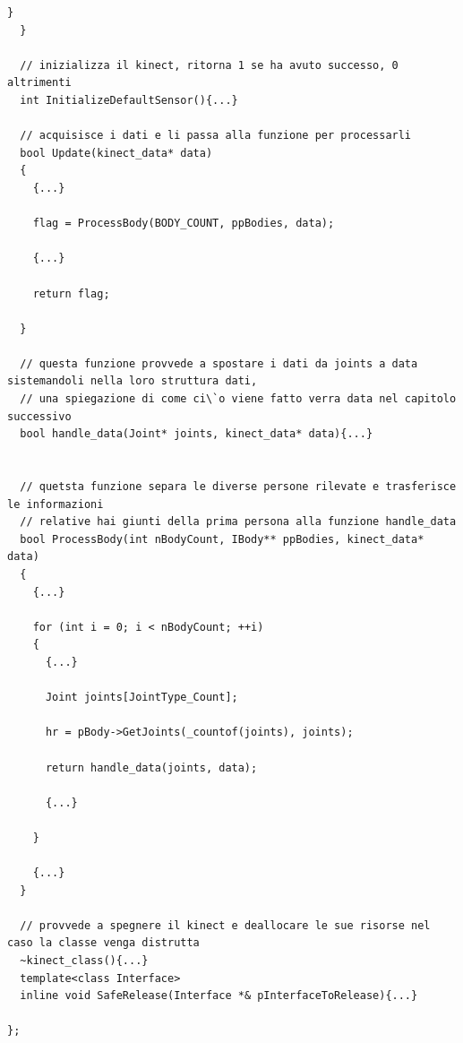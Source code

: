 \documentclass[10pt,a4paper]{article}
\begin{document}
\begin{lstlisting}[style=mycpp, caption=classe kinect\_class, captionpos=b]
    }
  }

  // inizializza il kinect, ritorna 1 se ha avuto successo, 0 altrimenti
  int InitializeDefaultSensor(){...}

  // acquisisce i dati e li passa alla funzione per processarli
  bool Update(kinect_data* data)
  {
    {...}
    
    flag = ProcessBody(BODY_COUNT, ppBodies, data);
    
    {...}
    
    return flag;
    
  }

  // questa funzione provvede a spostare i dati da joints a data sistemandoli nella loro struttura dati, 
  // una spiegazione di come ci\`o viene fatto verra data nel capitolo successivo
  bool handle_data(Joint* joints, kinect_data* data){...}
  

  // quetsta funzione separa le diverse persone rilevate e trasferisce le informazioni 
  // relative hai giunti della prima persona alla funzione handle_data
  bool ProcessBody(int nBodyCount, IBody** ppBodies, kinect_data* data)
  {
    {...}
    
    for (int i = 0; i < nBodyCount; ++i)
    {
      {...}
      
      Joint joints[JointType_Count];

      hr = pBody->GetJoints(_countof(joints), joints);
      
      return handle_data(joints, data);
          
      {...}
      
    }
    
    {...}
  }

  // provvede a spegnere il kinect e deallocare le sue risorse nel caso la classe venga distrutta
  ~kinect_class(){...}
  template<class Interface>
  inline void SafeRelease(Interface *& pInterfaceToRelease){...}

};
\end{lstlisting}
%
%
\end{document}
